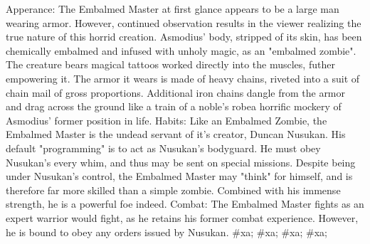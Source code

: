 \documentclass[twoside]{book}
\begin{document}
\begin{multicols}{2}
{           Apperance: The Embalmed Master at first glance appears to be a
           large man wearing armor. However, continued observation
           results in the viewer realizing the true nature of this horrid
           creation. Asmodius' body, stripped of its skin, has been
           chemically embalmed and infused with unholy magic, as an
           "embalmed zombie". The creature bears magical tattoos worked
           directly into the muscles, futher empowering it. The armor it
           wears is made of heavy chains, riveted into a suit of chain
           mail of gross proportions. Additional iron chains dangle from
           the armor and drag across the ground like a train of a
           noble's robea horrific mockery of Asmodius'
           former position in life. Habits: Like an Embalmed Zombie, the
           Embalmed Master is the undead servant of it's creator,
           Duncan Nusukan. His default "programming" is to act as
           Nusukan's bodyguard. He must obey Nusukan's every
           whim, and thus may be sent on special missions. Despite being
           under Nusukan's control, the Embalmed Master may "think"
           for himself, and is therefore far more skilled than a simple
           zombie. Combined with his immense strength, he is a powerful
           foe indeed. Combat: The Embalmed Master fights as an expert
           warrior would fight, as he retains his former combat
           experience. However, he is bound to obey any orders issued by
           Nusukan. }\vspace{1ex}
    \hspace{-2ex}
\#xa;
\#xa;
\vspace{1ex}
    \hspace{-2ex}
\#xa;
\#xa;
\end{multicols}
\end{document}
